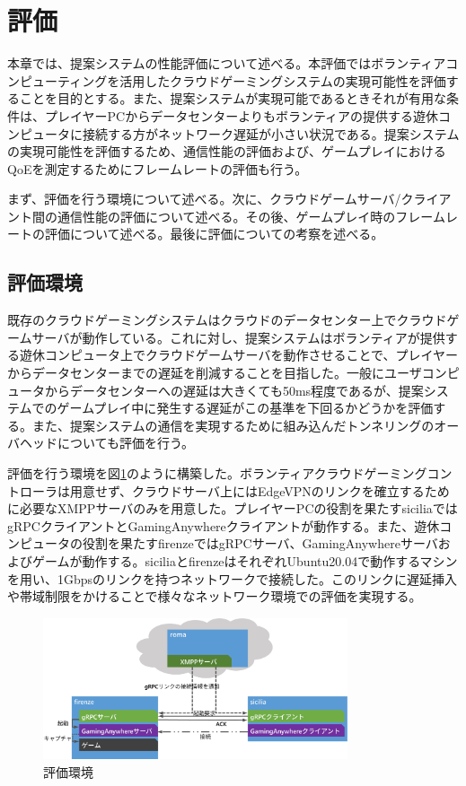 \section{評価}
本章では、提案システムの性能評価について述べる。本評価ではボランティアコンピューティングを活用したクラウドゲーミングシステムの実現可能性を評価することを目的とする。また、提案システムが実現可能であるときそれが有用な条件は、プレイヤーPCからデータセンターよりもボランティアの提供する遊休コンピュータに接続する方がネットワーク遅延が小さい状況である。提案システムの実現可能性を評価するため、通信性能の評価および、ゲームプレイにおけるQoEを測定するためにフレームレートの評価も行う。

まず、評価を行う環境について述べる。次に、クラウドゲームサーバ/クライアント間の通信性能の評価について述べる。その後、ゲームプレイ時のフレームレートの評価について述べる。最後に評価についての考察を述べる。

\subsection{評価環境}
既存のクラウドゲーミングシステムはクラウドのデータセンター上でクラウドゲームサーバが動作している。これに対し、提案システムはボランティアが提供する遊休コンピュータ上でクラウドゲームサーバを動作させることで、プレイヤーからデータセンターまでの遅延を削減することを目指した。一般にユーザコンピュータからデータセンターへの遅延は大きくても50ms程度であるが、提案システムでのゲームプレイ中に発生する遅延がこの基準を下回るかどうかを評価する。また、提案システムの通信を実現するために組み込んだトンネリングのオーバヘッドについても評価を行う。

評価を行う環境を図\ref{fig:expenv}のように構築した。ボランティアクラウドゲーミングコントローラは用意せず、クラウドサーバ上にはEdgeVPNのリンクを確立するために必要なXMPPサーバのみを用意した。プレイヤーPCの役割を果たすsiciliaではgRPCクライアントとGamingAnywhereクライアントが動作する。また、遊休コンピュータの役割を果たすfirenzeではgRPCサーバ、GamingAnywhereサーバおよびゲームが動作する。siciliaとfirenzeはそれぞれUbuntu20.04で動作するマシンを用い、1Gbpsのリンクを持つネットワークで接続した。このリンクに遅延挿入や帯域制限をかけることで様々なネットワーク環境での評価を実現する。

\begin{figure}[t]
    \centering
    \includegraphics[width=0.8\textwidth,keepaspectratio,clip]{img/experimentalenvironment.eps}
    \caption{評価環境}
    \label{fig:expenv}
\end{figure}

